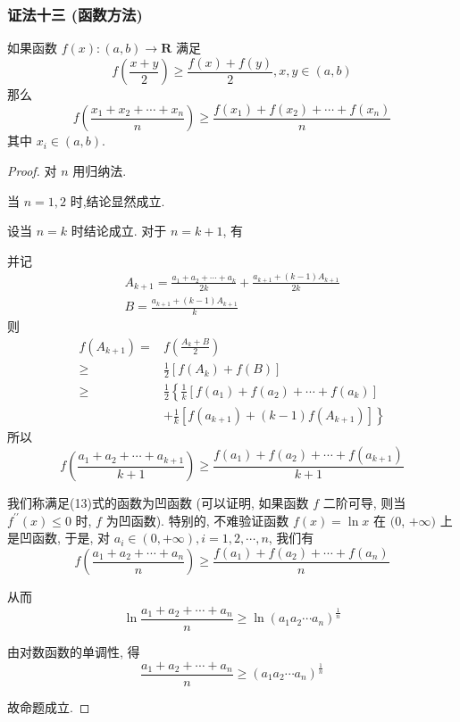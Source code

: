 \subsubsection*{证法十三 (函数方法)}
\begin{lemma}\label{lem:证法十三引理}
如果函数 $f(x):(a, b) \rightarrow \mathbf{R}$ 满足
\begin{equation*}
f\left(\frac{x+y}{2}\right) \geqslant \frac{f(x)+f(y)}{2}, x, y \in(a, b) \tag{13}
\end{equation*}
那么
\begin{equation*}
f\left(\frac{x_{1}+x_{2}+\cdots+x_{n}}{n}\right) \geqslant \frac{f\left(x_{1}\right)+f\left(x_{2}\right)+\cdots+f\left(x_{n}\right)}{n} \tag{14}
\end{equation*}
其中 $x_{i} \in(a, b)$.
\end{lemma}
\begin{proof}
对 $n$ 用归纳法.

当 $n=1,2$ 时,结论显然成立.

设当 $n=k$ 时结论成立. 对于 $n=k+1$, 有

并记
$$
\begin{gathered}
A_{k+1}=\frac{a_{1}+a_{2}+\cdots+a_{k}}{2 k}+\frac{a_{k+1}+(k-1) A_{k+1}}{2 k} \\
B=\frac{a_{k+1}+(k-1) A_{k+1}}{k}
\end{gathered}
$$
则
$$
\begin{aligned}
f\left(A_{k+1}\right)= & f\left(\frac{A_{k}+B}{2}\right) \\
\geqslant & \frac{1}{2}\left[f\left(A_{k}\right)+f(B)\right] \\
\geqslant & \frac{1}{2}\left\{\frac{1}{k}\left[f\left(a_{1}\right)+f\left(a_{2}\right)+\cdots+f\left(a_{k}\right)\right]\right. \\
& \left.+\frac{1}{k}\left[f\left(a_{k+1}\right)+(k-1) f\left(A_{k+1}\right)\right]\right\}
\end{aligned}
$$
所以
$$
f\left(\frac{a_{1}+a_{2}+\cdots+a_{k+1}}{k+1}\right) \geqslant \frac{f\left(a_{1}\right)+f\left(a_{2}\right)+\cdots+f\left(a_{k+1}\right)}{k+1}
$$

我们称满足(13)式的函数为凹函数 (可以证明, 如果函数 $f$ 二阶可导, 则当 $f^{\prime \prime}(x) \leqslant 0$ 时, $f$ 为凹函数). 特别的, 不难验证函数 $f(x)=\ln x$ 在 $(0$, $+\infty)$ 上是凹函数, 于是, 对 $a_{i} \in(0,+\infty), i=1,2, \cdots, n$, 我们有
$$
f\left(\frac{a_{1}+a_{2}+\cdots+a_{n}}{n}\right) \geqslant \frac{f\left(a_{1}\right)+f\left(a_{2}\right)+\cdots+f\left(a_{n}\right)}{n}
$$

从而
$$
\ln \frac{a_{1}+a_{2}+\cdots+a_{n}}{n} \geqslant \ln \left(a_{1} a_{2} \cdots a_{n}\right)^{\frac{1}{n}}
$$

由对数函数的单调性, 得
$$
\frac{a_{1}+a_{2}+\cdots+a_{n}}{n} \geqslant\left(a_{1} a_{2} \cdots a_{n}\right)^{\frac{1}{n}}
$$

故命题成立.
\end{proof}

